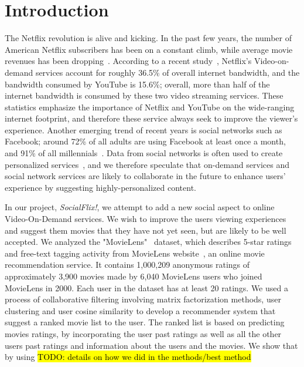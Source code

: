 \section{Introduction}
\label{sec:intro}

The Netflix revolution is alive and kicking. 
In the past few years, the number of American Netflix subscribers has been on a constant climb, while average movie revenues has been dropping~\cite{MisixNetflix}.
According to a recent study~\cite{VarietyNetflixBandwidth}, Netflix's Video-on-demand services account for roughly 36.5\% of overall internet bandwidth, and the bandwidth consumed by YouTube is 15.6\%; overall, more than half of the internet bandwidth is consumed by these two video streaming services.
These statistics emphasize the importance of Netflix and YouTube on the wide-ranging internet footprint, and therefore these service always seek to improve the viewer's experience.
Another emerging trend of recent years is social networks such as Facebook; around 72\% of all adults are using Facebook at least once a month, and 91\% of all millennials~\cite{FacebookStats}. 
Data from social networks is often used to create personalized services~\cite{carmel2009personalized}, and we therefore speculate that on-demand services and social network services are likely to collaborate in the future to enhance users' experience by suggesting highly-personalized content.

In our project, \textit{SocialFlix!}, we attempt to add a new social aspect to online Video-On-Demand services. We wish to improve the users viewing experiences and suggest them movies that they have not yet seen, but are likely to be well accepted. We analyzed the "MovieLens"~\cite{GroupLens} dataset, which describes 5-star ratings and free-text tagging activity from MovieLens website~\cite{MovieLens}, an online movie recommendation service. It contains 1,000,209 anonymous ratings of approximately 3,900 movies made by 6,040 MovieLens users who joined MovieLens in 2000. Each user in the dataset has at least 20 ratings. We used a process of collaborative filtering involving matrix factorization methods, user clustering and user cosine similarity to develop a recommender system that suggest a ranked movie list to the user. The ranked list is based on predicting movies ratings, by incorporating the user past ratings as well as all the other users past ratings and information about the users and the movies. We show that by using \hl{TODO: details on how we did in the methods/best method}

